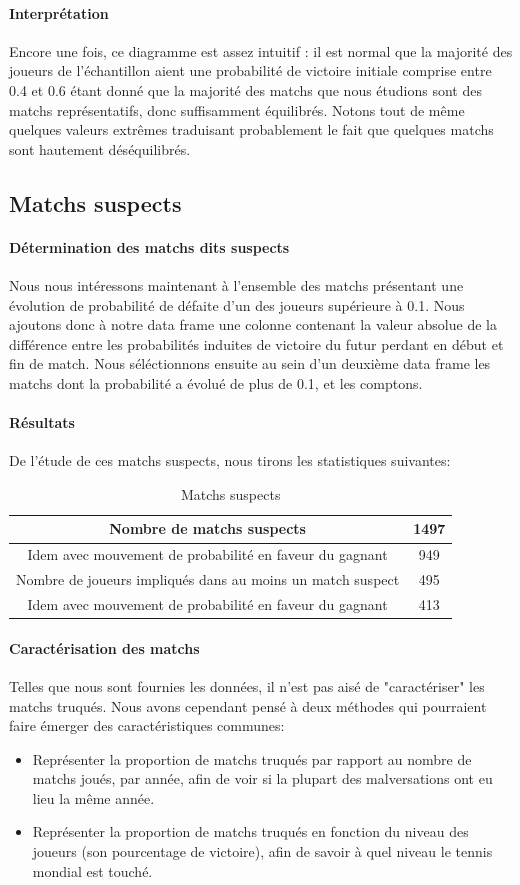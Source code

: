 \documentclass{report}
\begin{document}
\paragraph{Interprétation}
Encore une fois, ce diagramme est assez intuitif : il est normal que la
majorité des joueurs de l'échantillon aient une probabilité de victoire initiale
comprise entre 0.4 et 0.6 étant donné que la majorité des matchs que nous
étudions sont des matchs représentatifs, donc suffisamment équilibrés. Notons
tout de même quelques valeurs extrêmes traduisant probablement le fait que
quelques matchs sont hautement déséquilibrés.
\subsection{Matchs suspects}
\paragraph{Détermination des matchs dits suspects}
Nous nous intéressons maintenant à l'ensemble des matchs présentant une évolution
de probabilité de défaite d'un des joueurs supérieure à 0.1. Nous ajoutons donc à notre data frame une colonne contenant la valeur absolue de la
différence entre les probabilités induites de victoire du futur perdant en début et fin de
match. Nous séléctionnons ensuite au sein d'un deuxième data frame les matchs
dont la probabilité a évolué de plus de 0.1, et les comptons.
\paragraph{Résultats}
De l'étude de ces matchs suspects, nous tirons les statistiques suivantes:
\begin{table}[h!]
  \centering
  \caption{Matchs suspects}
  \label{tab:table4}
  \begin{tabular}{c|c}
        Nombre de matchs suspects & 1497\\
      \hline
        Idem avec mouvement de probabilité en faveur du gagnant & 949\\
      \hline
        Nombre de joueurs impliqués dans au moins un match suspect & 495\\
      \hline
        Idem avec mouvement de probabilité en faveur du gagnant & 413
  \end{tabular}
\end{table}
\paragraph{Caractérisation des matchs}
Telles que nous sont fournies les données, il n'est pas aisé de "caractériser"
les matchs truqués. Nous avons cependant pensé à deux méthodes qui pourraient
faire émerger des caractéristiques communes:
\begin{itemize}
\item Représenter la proportion de matchs truqués par rapport au nombre de
    matchs joués, par année, afin de voir si la plupart des malversations ont eu
    lieu la même année.
\item Représenter la proportion de matchs truqués en fonction du niveau des
    joueurs (son pourcentage de victoire), afin de savoir à quel niveau le tennis mondial
    est touché.
\end{itemize}
\end{document}
